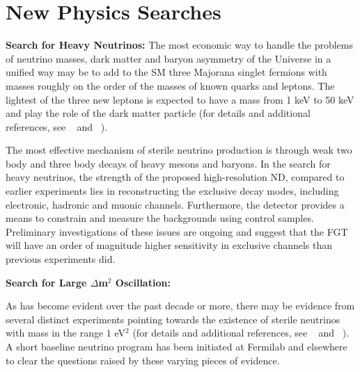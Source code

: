 \section{New Physics Searches} 
\label{sec-nd-np} 

\vspace{0.25cm} 
\noindent 
{\bf Search for Heavy Neutrinos:} 
The most economic way to handle the problems of neutrino masses, dark matter and baryon asymmetry of the Universe in a unified way may be to add to the SM three Majorana singlet fermions with masses roughly on the order of the masses of known quarks and leptons. 
 The lightest of the three new leptons is expected to have a mass from 1 keV to 50 keV and play the role of the dark matter particle (for details and additional references, see ~\cite{DPR} and ~\cite{Adams:2013qkq}).

\vspace{0.25cm} 
\noindent 
The most effective  mechanism of sterile neutrino production is through weak two body and three body decays of heavy mesons and baryons. In the search for heavy neutrinos, the strength of the proposed high-resolution ND, compared to earlier experiments lies in reconstructing the exclusive decay modes, including electronic, hadronic and muonic channels. Furthermore, the detector provides a means to constrain and measure the backgrounds using control samples. Preliminary investigations of these issues are ongoing and  suggest that the FGT  will have an order of magnitude higher sensitivity in exclusive channels than previous experiments did. 

\vspace{0.25cm} 
\noindent 
{\bf Search for Large $\Delta$m$^2$ Oscillation:} 

\vspace{0.25cm} 
\noindent 
As has become evident over the past decade or more, there may be evidence from several distinct experiments pointing towards the existence of sterile neutrinos with mass in the range $1$ eV$^2$ (for details and additional references, see ~\cite{DPR} and ~\cite{Adams:2013qkq}).  A short baseline neutrino program has been initiated at Fermilab and elsewhere to clear the questions raised by these varying pieces of evidence.  

